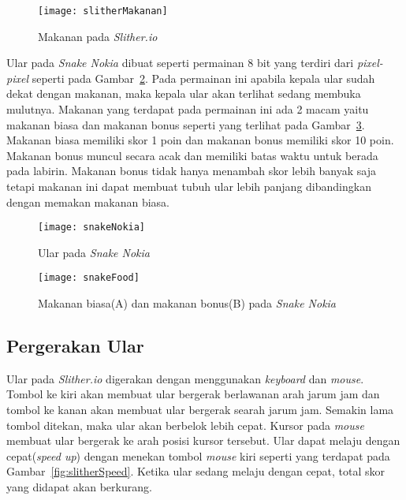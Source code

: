 \begin{figure}[H]
	\centering  
	\texttt{[image: slitherMakanan]}  
	\caption[Makanan pada \textit{Slither.io}]{Makanan pada \textit{Slither.io}}
	\label{fig:slitherMakanan} 
\end{figure}

Ular pada \textit{Snake Nokia} dibuat seperti permainan 8 bit yang terdiri dari \textit{pixel-pixel} seperti pada Gambar~\ref{fig:snakeNokia}. Pada permainan ini apabila kepala ular sudah dekat dengan makanan, maka kepala ular akan terlihat sedang membuka mulutnya. Makanan yang terdapat pada permainan ini ada 2 macam yaitu makanan biasa dan makanan bonus seperti yang terlihat pada Gambar~\ref{fig:snakeFood}. Makanan biasa memiliki skor 1 poin dan makanan bonus memiliki skor 10 poin. Makanan bonus muncul secara acak dan memiliki batas waktu untuk berada pada labirin. Makanan bonus tidak hanya menambah skor lebih banyak saja tetapi makanan ini dapat membuat tubuh ular lebih panjang dibandingkan dengan memakan makanan biasa.

\begin{figure}[H]
	\centering  
	\texttt{[image: snakeNokia]}  
	\caption[Ular pada \textit{Snake Nokia}]{Ular pada \textit{Snake Nokia}}
	\label{fig:snakeNokia} 
\end{figure}

\begin{figure}[H]
	\centering  
	\texttt{[image: snakeFood]}  
	\caption[Makanan biasa(A) dan makanan bonus(B) pada \textit{Snake Nokia}]{Makanan biasa(A) dan makanan bonus(B) pada \textit{Snake Nokia}}
	\label{fig:snakeFood} 
\end{figure}

\subsection{Pergerakan Ular}
Ular pada \textit{Slither.io} digerakan dengan menggunakan \textit{keyboard} dan \textit{mouse}. Tombol ke kiri akan membuat ular bergerak berlawanan arah jarum jam dan tombol ke kanan akan membuat ular bergerak searah jarum jam. Semakin lama tombol ditekan, maka ular akan berbelok lebih cepat. Kursor pada \textit{mouse} membuat ular bergerak ke arah posisi kursor tersebut. Ular dapat melaju dengan cepat(\textit{speed up}) dengan menekan tombol \textit{mouse} kiri seperti yang terdapat pada Gambar~\ref{fig:slitherSpeed}. Ketika ular sedang melaju dengan cepat, total skor yang didapat akan berkurang. 

